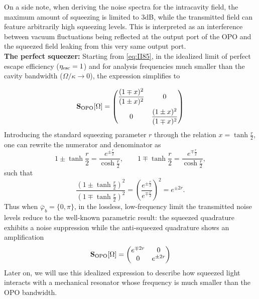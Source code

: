 On a side note, when deriving the noise spectra for the intracavity field, the maximum amount of squeezing is limited to 3dB, while the transmitted field can feature arbitrarily high squeezing levels. This is interpreted as an interference between vacuum fluctuations being reflected at the output port of the OPO and the squeezed field leaking from this very same output port. \\

\noindent \textbf{The perfect squeezer: } Starting from \eqref{eq:II85}, in the idealized limit of perfect escape efficiency ($\eta_{\rm esc}=1$) and for analysis frequencies much smaller than the cavity bandwidth ($\Omega/\kappa \to 0$), the expression simplifies to

\begin{equation}
      \mathbf{S}_{\rm OPO}[\Omega] =\begin{pmatrix}
         \dfrac{(1 \mp x)^2}{(1 \pm x)^2} & 0 \\[10pt]
        0 & \dfrac{(1 \pm x)^2}{(1 \mp x)^2} 
      \end{pmatrix}
\end{equation}
Introducing the standard squeezing parameter $r$ through the relation $x=\tanh \frac{r}{2}$, one can rewrite the numerator and denominator as
\begin{equation*}
1 \pm \tanh \frac{r}{2} = \frac{e^{\pm \frac{r}{2}}}{\cosh \frac{r}{2}}, 
\qquad
1 \mp \tanh \frac{r}{2} = \frac{e^{\mp \frac{r}{2}}}{\cosh \frac{r}{2}},
\end{equation*}
such that
\begin{equation*}
\frac{(1 \pm \tanh \frac{r}{2})^2}{(1 \mp \tanh \frac{r}{2})^2}
= \left(\frac{e^{\pm \frac{r}{2}}}{e^{\mp \frac{r}{2}}}\right)^2
= e^{\pm 2r}.
\end{equation*}
Thus when $\bar\varphi_b=\{0,\pi\}$, in the lossless, low-frequency limit the transmitted noise levels reduce to the well-known parametric result: the squeezed quadrature exhibits a noise suppression while the anti-squeezed quadrature shows an amplification
\begin{equation}
      \mathbf{S}_{\rm OPO}[\Omega] =\begin{pmatrix}
         e^{\mp 2r} & 0 \\
        0 & e^{\pm 2r} 
      \end{pmatrix}
      \label{eq:perfect_squeezer}
\end{equation}
Later on, we will use this idealized expression to describe how squeezed light interacts with a mechanical resonator whose frequency is much smaller than the OPO bandwidth. 

